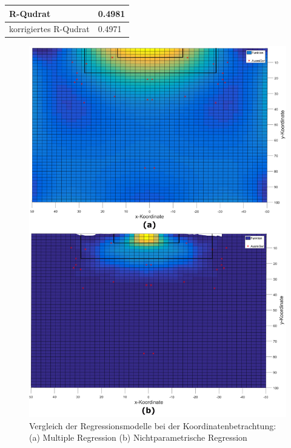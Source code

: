 \tablehead{}
\tabletail{}
\tablelasttail{}
\begin{center}%
\begin{supertabular}{ | P{6cm} | P{3cm}  |}
\textsf{R-Qudrat} 	& 0.4981	\\
\hline
\textsf{korrigiertes R-Qudrat} 	&  0.4971	\\
\hline
\end{supertabular}
\end{center}

\begin{figure}[H]
\centering
\includegraphics[scale=0.34]{se-wa-jpg/heatmap}
\caption[Vergleich der Regressionsmodelle bei der Koordinatenbetrachtung ]{Vergleich der Regressionsmodelle bei der Koordinatenbetrachtung: (a) Multiple Regression (b) Nichtparametrische Regression}
\label{heatmap}
\end{figure}